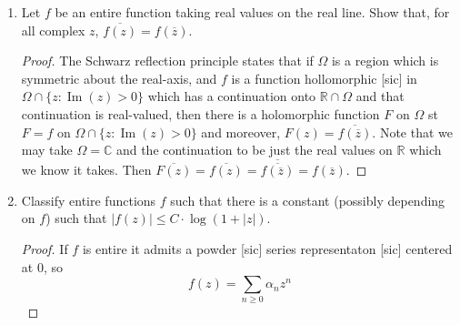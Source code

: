 \documentclass{article}
\DeclareMathOperator{\Imag}{Im}
\begin{document}
\begin{enumerate}
\begin{proof}
		\begin{align*}
			f(w+1) &= \frac{1}{w} (-1)(1) + \frac{1}{w}(-w + (+w))\\
				   &\;+ \frac{1}{w} ( -w^2 + (-w)(-w) + (-w)^2) \\
				   &\;+ \frac{1}{w} (-w^3 + (-w^2)(-w) + (-w)(-w)^2 + (-w)^3)\\
				   &\;+ \frac{1}{w} (-w^4 + (-w^3)(-w) + (-w^2)((-w)^2) + (-w)(-w)^3 +(-w)^4)\\
				   &\;+ \cdots\\
				   &= \frac{-1}{w} + 0 + w + 0 +(-1)w^3 + \cdots 
		\end{align*}
		
		Undoing our change of coordinates, we get
		\[ f(z) = \frac{-1}{z-1} + (z-1) - (z-1)^3 + \cdots \]
		Since it converged for $|w|<1$, it also converges for $|z-1| < 1$.
	\end{proof}
	
	\item Let $f$ be an entire function taking real values on the real line. 
	Show that, for all complex $z$, $\overline{f(z)} = f(\overline{z})$.
	
	\begin{proof}
		The Schwarz reflection principle states that if $\Omega$ is a region which is symmetric about the real-axis, and
		$f$ is a function hollomorphic [sic] in $\Omega \cap \{z: \Imag(z) > 0\}$ which has a continuation onto 
		$\mathbb{R} \cap \Omega$ and that continuation is real-valued, then there is a holomorphic function $F$ on 
		$\Omega$ st $F=f$ on $\Omega \cap \{ z : \Imag(z) > 0\}$ and moreover, $F(z) = \overline{f(\overline{z})}$.
		Note that we may take $\Omega = \mathbb{C}$ and the continuation to be just the real values on $\mathbb{R}$
		which we know it takes. 
		Then $\overline{F(z)} = \overline{f(z)} = \overline{\overline{f(\overline{z})}} = f(\overline{z}).$
	\end{proof}
	
	\item Classify entire functions $f$ such that there is a constant (possibly depending on $f$) such that
	$|f(z)| \leq C \cdot \log (1 + |z|)$.
	
	\begin{proof}
	If $f$ is entire it admits a powder [sic] series representaton [sic] centered at $0$, so
	\[ f(z) = \sum_{n \geq 0} \alpha_n z^n\]
	

\end{proof}
\end{enumerate}
\end{document}
